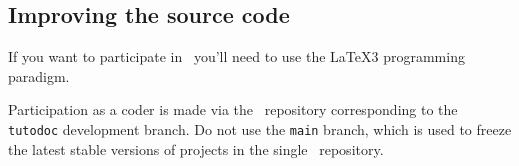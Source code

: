 \documentclass[10pt, a4paper]{tutodoc}
\begin{document}

\subsection{Improving the source code}

\begin{tdocimp}
	If you want to participate in \thisproj\, you'll need to use the \LaTeX3 programming paradigm.
\end{tdocimp}


Participation as a coder is made via the \thisrepo\ repository corresponding to the \verb#tutodoc# development branch.
Do not use the \verb#main# branch, which is used to freeze the latest stable versions of projects in the single \thismonorepo\ repository.
\end{document}
